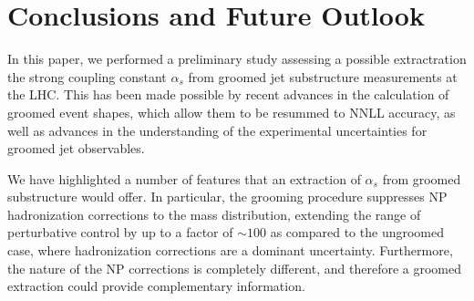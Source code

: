 \documentclass[11pt,letterpaper]{article}
\newcommand{\info}[1]{\textbf{\textcolor{mildred}{(#1)}}}
\begin{document}
%


%


%

\clearpage

\section{Conclusions and Future Outlook}
\label{sec:future}

In this paper,  we performed a preliminary study assessing a possible extractration the strong coupling constant $\alpha_s$ from groomed jet substructure measurements at the LHC.
%
This has been made possible by recent advances in the calculation of groomed event shapes, which allow them to be resummed to NNLL accuracy, as well as advances in the understanding of the experimental uncertainties for groomed jet observables.
 
We have highlighted a number of features that an extraction of $\alpha_s$ from groomed substructure would offer.
%
In particular, the grooming procedure suppresses NP hadronization corrections to the mass distribution, extending the range of perturbative control by up to a factor of $\sim 100$ as compared to the ungroomed case, where hadronization corrections are a dominant uncertainty.
%
Furthermore, the nature of the NP corrections is completely different, and therefore a groomed extraction could provide complementary information. 
\end{document}
